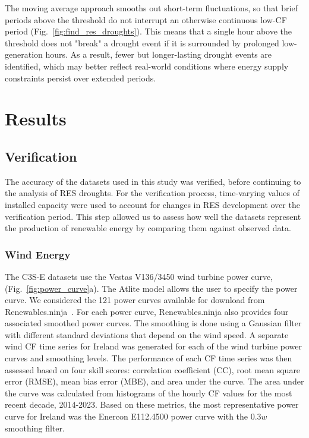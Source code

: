 \documentclass[a4paper, 11p1t]{article}
\begin{document}
The moving average approach smooths out short-term fluctuations, so that brief periods above the threshold do not interrupt an otherwise continuous low-CF period (Fig.~\ref{fig:find_res_droughts}). This means that a single hour above the threshold does not "break" a drought event if it is surrounded by prolonged low-generation hours. As a result, fewer but longer-lasting drought events are identified, which may better reflect real-world conditions where energy supply constraints persist over extended periods.

\section{Results}
\label{sec:Results}

\subsection{Verification}
\label{sec:verification}

The accuracy of the datasets used in this study was verified, before continuing to the analysis of RES droughts. For the verification process, time-varying values of installed capacity were used to account for changes in RES development over the verification period. This step allowed us to assess how well the datasets represent the production of renewable energy by comparing them against observed data.

\subsubsection{Wind Energy}
\label{sec:wind_verification}

The C3S-E datasets use the Vestas V136/3450 wind turbine power curve, (Fig.~\ref{fig:power_curve}a). The Atlite model allows the user to specify the power curve. We considered the 121 power curves available for download from Renewables.ninja~\cite{staffell2016wake}. For each power curve, Renewables.ninja also provides four associated smoothed power curves. The smoothing is done using a Gaussian filter with different standard deviations that depend on the wind speed. A separate wind CF time series for Ireland was generated for each of the wind turbine power curves and smoothing levels. The performance of each CF time series was then assessed based on four skill scores: correlation coefficient (CC), root mean square error (RMSE), mean bias error (MBE), and area under the curve. The area under the curve was calculated from histograms of the hourly CF values for the most recent decade, 2014-2023. Based on these metrics, the most representative power curve for Ireland was the Enercon E112.4500 power curve with the $0.3w$  smoothing filter.
\end{document}
